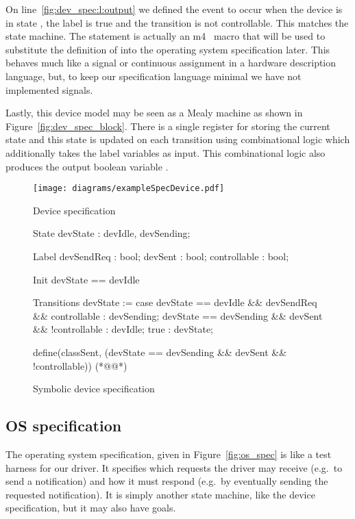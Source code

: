 On line~\ref{fig:dev_spec:l:output} we defined the  event to occur when the device is in state , the  label is true and the transition is not controllable. This matches the state machine. The  statement is actually an m4~\cite{m4} macro that will be used to substitute the definition of  into the operating system specification later. This behaves much like a signal or continuous assignment in a hardware description language, but, to keep our specification language minimal we have not implemented signals.

Lastly, this device model may be seen as a Mealy machine as shown in Figure~\ref{fig:dev_spec_block}. There is a single register for storing the current state and this state is updated on each transition using combinational logic which additionally takes the label variables as input. This combinational logic also produces the output boolean variable .

\begin{figure}
\centering
\texttt{[image: diagrams/exampleSpecDevice.pdf]}
\caption{Device specification}
\label{fig:dev_spec}
\end{figure}

\begin{figure}
\centering
\begin{asllisting}
State
devState : {devIdle, devSending};

Label
devSendReq   : bool;
devSent      : bool;
controllable : bool;

Init
devState == devIdle

Transitions
devState := case {
    devState == devIdle && devSendReq && controllable  : devSending;
    devState == devSending && devSent && !controllable : devIdle;
    true                                               : devState;
}

define(classSent, (devState == devSending && devSent && !controllable)) (*@\label{fig:dev_spec:l:output}@*)

\end{asllisting}
\caption{Symbolic device specification}
\label{fig:dev_spec_asl}
\end{figure}

\subsection{OS specification}

The operating system specification, given in Figure~\ref{fig:os_spec} is like a test harness for our driver. It specifies which requests the driver may receive (e.g.\ to send a notification) and how it must respond (e.g.\ by eventually sending the requested notification). It is simply another state machine, like the device specification, but it may also have goals.

